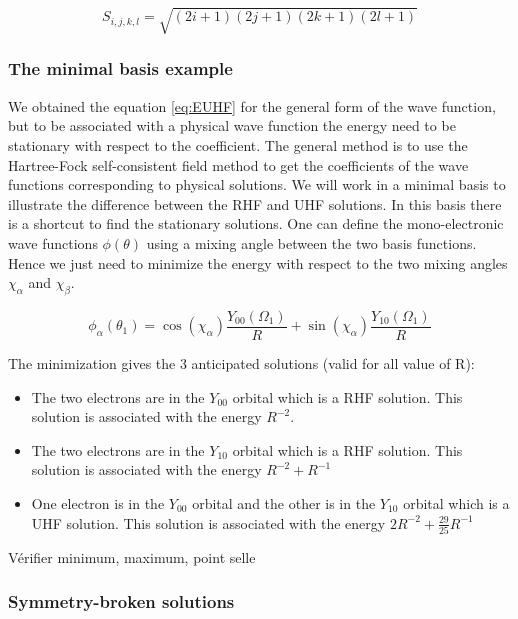 \documentclass[11pt,a4paper]{article}
\begin{document}
\begin{equation*}
S_{i,j,k,l}=\sqrt{(2i+1)(2j+1)(2k+1)(2l+1)}
\end{equation*}

\subsubsection{The minimal basis example}

We obtained the equation \eqref{eq:EUHF} for the general form of the wave function, but to be associated with a physical wave function the energy need to be stationary with respect to the coefficient. The general method is to use the Hartree-Fock self-consistent field method to get the coefficients of the wave functions corresponding to physical solutions. We will work in a minimal basis to illustrate the difference between the RHF and UHF solutions. In this basis there is a shortcut to find the stationary solutions. One can define the mono-electronic wave functions $\phi(\theta)$ using a mixing angle between the two basis functions. Hence we just need to minimize the energy with respect to the two mixing angles $\chi_\alpha$ and $\chi_\beta$.

\begin{equation}
\phi_\alpha(\theta_1)= \cos(\chi_\alpha)\frac{Y_{00}(\Omega_1)}{R} + \sin(\chi_\alpha)\frac{Y_{10}(\Omega_1)}{R}
\end{equation}
 
The minimization gives the 3 anticipated solutions (valid for all value of R):
\begin{itemize}
\item The two electrons are in the $Y_{00}$ orbital which is a RHF solution. This solution is associated with the energy $R^{-2}$.
\item The two electrons are in the $Y_{10}$ orbital which is a RHF solution. This solution is associated with the energy $R^{-2} + R^{-1}$
\item One electron is in the $Y_{00}$ orbital and the other is in the $Y_{10}$ orbital which is a UHF solution. This solution is associated with the energy $2R^{-2}+\frac{29}{25}R^{-1}$
\end{itemize}

Vérifier minimum, maximum, point selle

\subsubsection{Symmetry-broken solutions}
\end{document}
